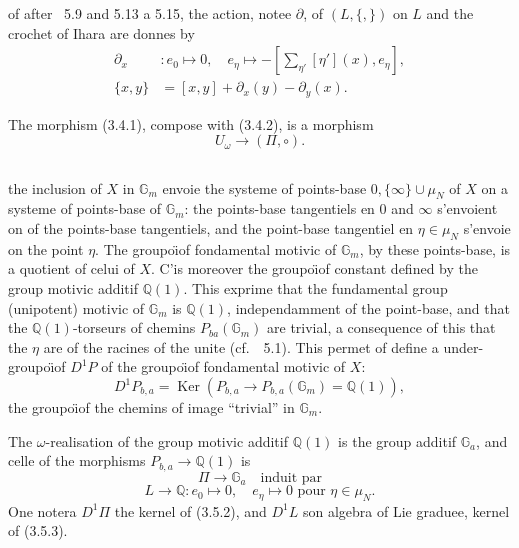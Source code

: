\documentclass[11pt,a4paper]{article}
\theoremstyle{plain}
\theoremstyle{definition}
\DeclareMathOperator{\Ker}{Ker}
\newcommand{\Gm}{\mathbb{G}_m}
\newcommand{\Ga}{\mathbb{G}_a}
\newcommand{\Q}{\mathbb{Q}}
\begin{document}
of after \cite{1}~5.9 and 5.13 a 5.15, the action, notee $\partial$, of $(L, \{,\})$ on $L$ and the crochet of Ihara are donnes by
\begin{align}
\partial_x &: e_0 \mapsto 0, \quad e_\eta \mapsto -[\sum_{\eta'} [\eta'](x), e_\eta], \label{eq:3.4.4}\\
\{x,y\} &= [x,y] + \partial_x(y) - \partial_y(x). \label{eq:3.4.5}
\end{align}

The morphism (3.4.1), compose with (3.4.2), is a morphism
\begin{equation}\label{eq:3.4.6}
U_\omega \to (\Pi, \circ).
\end{equation}

\subsection{}
the inclusion of $X$ in $\Gm$ envoie the systeme of points-base $0, \{\infty\} \cup \mu_N$ of $X$ on a systeme of points-base of $\Gm$: the points-base tangentiels en $0$ and $\infty$ s'envoient on of the points-base tangentiels, and the point-base tangentiel en $\eta \in \mu_N$ s'envoie on the point $\eta$. The groupo\"{\i}of fondamental motivic of $\Gm$, by these points-base, is a quotient of celui of $X$. C'is moreover the groupo\"{\i}of constant defined by the group motivic additif $\Q(1)$. This exprime that the fundamental group (unipotent) motivic of $\Gm$ is $\Q(1)$, independamment of the point-base, and that the $\Q(1)$-torseurs of chemins $P_{ba}(\Gm)$ are trivial, a consequence of this that the $\eta$ are of the racines of the unite (cf.~\cite{1}~5.1). This permet of define a under-groupo\"{\i}of $D^1P$ of the groupo\"{\i}of fondamental motivic of $X$:
\begin{equation}\label{eq:3.5.1}
D^1P_{b,a} = \Ker(P_{b,a} \to P_{b,a}(\Gm) = \Q(1)),
\end{equation}
the groupo\"{\i}of the chemins of image ``trivial'' in $\Gm$.

The $\omega$-realisation of the group motivic additif $\Q(1)$ is the group additif $\Ga$, and celle of the morphisms $P_{b,a} \to \Q(1)$ is
\begin{equation}\label{eq:3.5.2}
\Pi \to \Ga \quad \text{induit par}
\end{equation}
\begin{equation}\label{eq:3.5.3}
L \to \Q: e_0 \mapsto 0, \quad e_\eta \mapsto 0 \text{ pour } \eta \in \mu_N.
\end{equation}
One notera $D^1\Pi$ the kernel of (3.5.2), and $D^1L$ son algebra of Lie graduee, kernel of (3.5.3).
\end{document}
